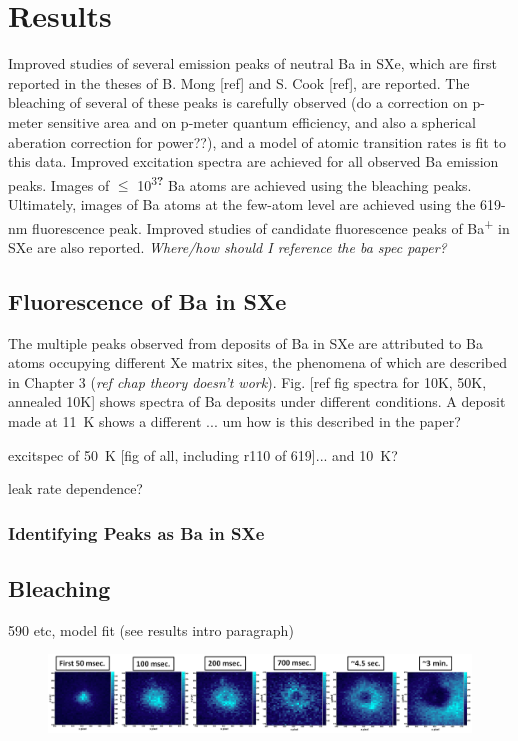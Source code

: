 \chapter{Results}

Improved studies of several emission peaks of neutral Ba in SXe, which are first reported in the theses of B. Mong [ref] and S. Cook [ref], are reported.  The bleaching of several of these peaks is carefully observed ({\color{red}do a correction on p-meter sensitive area and on p-meter quantum efficiency, and also a spherical aberation correction for power??}), and a model of atomic transition rates is fit to this data.  Improved excitation spectra are achieved for all observed Ba emission peaks.  Images of $\leq$ 10\textsuperscript{3\textbf{?}} Ba atoms are achieved using the bleaching peaks.  Ultimately, images of Ba atoms at the few-atom level are achieved using the 619-nm fluorescence peak.  Improved studies of candidate fluorescence peaks of Ba\textsuperscript{+} in SXe are also reported.  {\color{red}\emph{Where/how should I reference the ba spec paper?}}

\section{Fluorescence of Ba in SXe}

The multiple peaks observed from deposits of Ba in SXe are attributed to Ba atoms occupying different Xe matrix sites, the phenomena of which are described in Chapter 3 {\color{red}(\emph{ref chap theory doesn't work})}.  Fig. [ref fig spectra for 10K, 50K, annealed 10K] shows spectra of Ba deposits under different conditions.  A deposit made at 11~K shows a different ... um how is this described in the paper?

excitspec of 50~K [fig of all, including r110 of 619]... and 10~K?

leak rate dependence?

\subsection{Identifying Peaks as Ba in SXe}
\label{subsec:peakIdentify}

\section{Bleaching}

590 etc, model fit (see results intro paragraph)

\begin{figure}[H]
        \centering
                \includegraphics[width=.9\textwidth]{figures/hole_bleach_590.png}
                \caption{}
\label{fig:testfig}
\end{figure}

